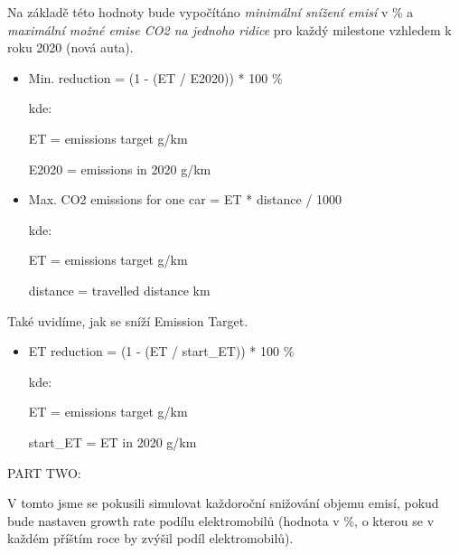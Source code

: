 \documentclass[a4paper, 11pt]{article}
\begin{document}
    \vspace*{3mm}
    
    Na základě této hodnoty bude vypočítáno \textit{minimální snížení emisí} v \% a \textit{maximální možné emise CO2 na jednoho ridice} pro každý milestone vzhledem k roku 2020 (nová auta).
    
    \vspace*{3mm}
    
    \begin{itemize}
    \item Min. reduction = (1 - (ET / E2020)) * 100 \%
    
    kde:
    \vspace*{2mm}
    
    ET = emissions target g/km
    
    E2020 = emissions in 2020 g/km
    
    \vspace*{3mm}
    
    \item Max. CO2 emissions for one car = ET * distance / 1000
        
    kde:
    \vspace*{2mm}
    
    ET = emissions target g/km
    
    distance = travelled distance km
    \end{itemize}
    
    \vspace*{3mm}
    
    Také uvidíme, jak se sníží Emission Target.
    
    \vspace*{3mm}
    
    \begin{itemize}
    \item ET reduction = (1 - (ET / start\_ET)) * 100 \%
        
    kde:
    \vspace*{2mm}
    
    ET = emissions target g/km
    
    start\_ET = ET in 2020 g/km
    \end{itemize}
    
    \vspace*{6mm}
    
    PART TWO:
    
    \vspace*{3mm}
    
    V tomto jsme se pokusili simulovat každoroční snižování objemu emisí, pokud bude nastaven growth rate podílu elektromobilů (hodnota v \%, o kterou se v každém příštím roce by zvýšil podíl elektromobilů).
    
\end{document}
